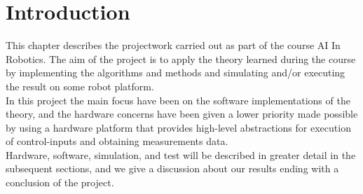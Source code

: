 
\section{Introduction} %
\label{sec:prokect_introduction}

This chapter describes the projectwork carried out as part of the course AI In Robotics. The aim of the project is to apply the theory learned during the course by implementing the algorithms and methods and simulating and/or executing the result on some robot platform.\\
In this project the main focus have been on the software implementations of the theory, and the hardware concerns have been given a lower priority made possible by using a hardware platform that provides high-level abstractions for execution of control-inputs and obtaining measurements data.\\

Hardware, software, simulation, and test will be described in greater detail in the subsequent sections, and we give a discussion about our results ending with a conclusion of the project.

